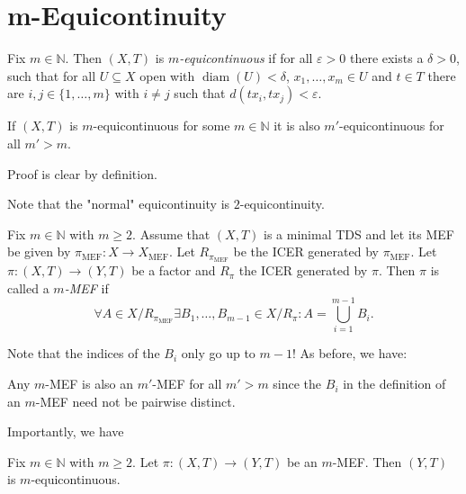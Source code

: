 \section{m-Equicontinuity}

\begin{frame}
	\begin{definition}
	    Fix $m \in \mathbb{N}$. Then $(X, T)$ is \emph{$m$-equicontinuous} if for all $\varepsilon > 0$ there exists a $\delta > 0$, such that for all $U \subseteq X$ open with $\operatorname{diam}(U) < \delta$, $x_1, \dots, x_m \in U$ and $t \in T$ there are $i, j \in \{1, \dots, m\}$ with $i \neq j$ such that $d(tx_i, tx_j) < \varepsilon$.
    \end{definition}
    \pause
    \begin{proposition}
	    If $(X, T)$ is $m$-equicontinuous for some $m \in \mathbb{N}$ it is also $m'$-equicontinuous for all $m' > m$.
    \end{proposition}
    Proof is clear by definition.

    Note that the "normal" equicontinuity is $2$-equicontinuity.
\end{frame}

\begin{frame}
    \begin{definition}[$m$-MEF]
        Fix $m \in \mathbb{N}$ with $m \geq 2$. Assume that $(X, T)$ is a minimal TDS and let its MEF be given by $\pi_{\mathrm{MEF}}: X \to X_{\mathrm{MEF}}$.
        Let $R_{\pi_{\mathrm{MEF}}}$ be the ICER generated by $\pi_{\text{MEF}}$. Let $\pi: (X,T) \to (Y,T)$ be a factor and $R_\pi$ the ICER generated by $\pi$.
        Then $\pi$ is called a \emph{$m$-MEF} if
        \begin{equation*}
            \forall A \in X/R_{\pi_{\mathrm{MEF}}} \exists B_1, \dots, B_{m-1} \in X/R_\pi: 
            A = \bigcup_{i=1}^{m-1} B_i.
        \end{equation*}
    \end{definition}
    Note that the indices of the $B_i$ only go up to $m-1$!
    \pause
    As before, we have:
    \begin{remark}
        Any $m$-MEF is also an $m'$-MEF for all $m' > m$
        since the $B_i$ in the definition of an $m$-MEF need not be pairwise distinct.
    \end{remark}
\end{frame}

\begin{frame}
    Importantly, we have
    \begin{proposition}
	    Fix $m \in \mathbb{N}$ with $m \geq 2$. Let $\pi : (X,T) \to (Y, T)$ be an $m$-MEF. Then $(Y, T)$ is $m$-equicontinuous.
    \end{proposition}
\end{frame}


